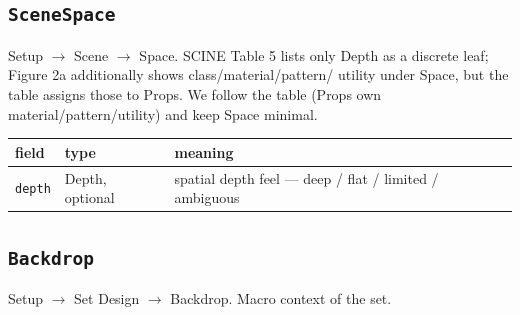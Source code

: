 \subsection*{\texttt{SceneSpace}}
\noindent Setup $\to$ Scene $\to$ Space. SCINE Table 5 lists only Depth as a discrete leaf; Figure 2a additionally shows class/\allowbreak{}material/\allowbreak{}pattern/\allowbreak{} utility under Space, but the table assigns those to Props. We follow the table (Props own material/\allowbreak{}pattern/\allowbreak{}utility) and keep Space minimal.

\begin{longtable}{@{}R{0.24\textwidth}R{0.21\textwidth}R{0.49\textwidth}@{}}
\toprule \textbf{field} & \textbf{type} & \textbf{meaning} \\ \midrule
\endhead
\texttt{depth} & Depth, optional & spatial depth feel ---\allowbreak{} deep /\allowbreak{} flat /\allowbreak{} limited /\allowbreak{} ambiguous \\
\bottomrule
\end{longtable}

\subsection*{\texttt{Backdrop}}
\noindent Setup $\to$ Set Design $\to$ Backdrop. Macro context of the set.

